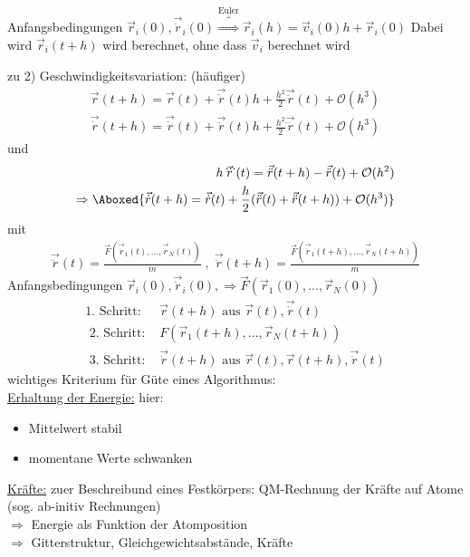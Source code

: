 \documentclass[12pt]{article}
\begin{document}
Anfangsbedingungen $ \vec{r}_i (0), \vec{\dot{r}}_i (0) \overbrace{\Rightarrow}^\text{Euler} \vec{r}_i (h) = \vec{v}_i (0) h + \vec{r}_i (0)$
Dabei wird $\vec{r}_i (t+h)$ wird berechnet, ohne dass $\vec{v}_i$ berechnet wird


zu 2) Geschwindigkeitsvariation: (häufiger)
\begin{align}
\vec{r}(t+h) = \vec{r}(t) + \vec{\dot{r}} (t) h + \frac{h^2}{2} \vec{\ddot{r}}(t) + \mathcal{O}(h^3) \\
\vec{\dot{r}}(t+h) = \vec{\dot{r}}(t) + \vec{\ddot{r}} (t) h + \frac{h^2}{2} \vec{\dddot{r}}(t) + \mathcal{O}(h^3) 
\end{align}
und
\begin{align}
h \vec{\dddot{r}}(t) = \vec{\ddot{r}} (t+h) - \vec{\ddot{r}} (t) + \mathcal{O}(h^2) \\
\Rightarrow \Aboxed{ \vec{\dot{r}} (t+h) = \vec{\dot{r}} (t) + \frac{h}{2} ( \vec{\ddot{r}} (t) + \vec{\ddot{r}} (t+h) ) + \mathcal{O}(h^3) }  
\end{align}
mit
\begin{align}
\vec{\ddot{r}} (t)= \frac{\vec{F} (\vec{\dot{r}}_1 (t), ... , \vec{\dot{r}}_N (t) ) }{m} \; , \; 
\vec{\ddot{r}} (t+h)= \frac{\vec{F} (\vec{\dot{r}}_1 (t+h), ... , \vec{\dot{r}}_N (t+h) ) }{m}
\end{align}
Anfangsbedingungen $\vec{r}_i (0), \vec{\dot{r}}_i (0), \Rightarrow \vec{F}(\vec{r}_1 (0), ..., \vec{r}_N (0))$
\begin{align}
\mbox{1. Schritt: } & \vec{r}(t+h) \mbox{ aus } \vec{r}(t), \vec{\dot{r}}(t) \\
\mbox{ 2. Schritt: } &  F( \vec{r}_1 (t+h),..., \vec{r}_N (t+h)) \\
\mbox{ 3. Schritt: } & \vec{\dot{r}}(t+h) \mbox{ aus } \vec{r}(t), \vec{r}(t+h), \vec{\dot{r}}(t)
\end{align}
wichtiges Kriterium für Güte eines Algorithmus:\\
\underline{Erhaltung der Energie:} hier: 
\begin{itemize}
\item Mittelwert stabil
\item momentane Werte schwanken
\end{itemize}
\underline{Kräfte:} zuer Beschreibund eines Festkörpers: QM-Rechnung der Kräfte auf Atome (sog. ab-initiv Rechnungen) \\
$\Rightarrow$ Energie als Funktion der Atomposition \\
$\Rightarrow$ Gitterstruktur, Gleichgewichtsabstände, Kräfte \\
\end{document}
